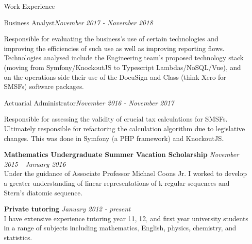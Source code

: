 \documentclass{resume} %
\begin{document}
\begin{rSection}{Work Experience}
\begin{adjustwidth}{2em}{}
    \begin{rSubsection}{Business Analyst}{\em November 2017 - November 2018}{}{}
    \item Responsible for evaluating the business's use of certain technologies and improving the efficiencies of such use as well as improving reporting flows. Technologies analysed include the Engineering team's proposed technology stack (moving from Symfony/KnockoutJS to Typescript Lambdas/NoSQL/Vue), and on the operations side their use of the DocuSign and Class (think Xero for SMSFs) software packages.
    \end{rSubsection}

    \begin{rSubsection}{Actuarial Administrator}{\em November 2016 - November 2017}{}{}
    \item Responsible for assessing the validity of crucial tax calculations for SMSFs. Ultimately responsible for refactoring the calculation algorithm due to legislative changes. This was done in Symfony (a PHP framework) and KnockoutJS.
    \end{rSubsection}
\end{adjustwidth}

{\bf Mathematics Undergraduate Summer Vacation Scholarship} \hfill {\em November 2015 - January 2016} \\
Under the guidance of Associate Professor Michael Coons Jr. I worked to develop a greater understanding of linear representations of k-regular sequences and Stern's diatomic sequence.

{\bf Private tutoring} \hfill {\em January 2012 - present} \\
I have extensive experience tutoring year 11, 12, and first year university students in a range of subjects including mathematics, English, physics, chemistry, and statistics.
\end{rSection}
\end{document}
